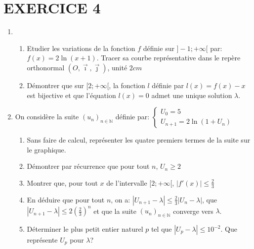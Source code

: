 \documentclass[13pts]{report}
\begin{document}
\section*{EXERCICE 4}
\begin{enumerate}
	\item \begin{enumerate}
				\item Etudier les variations de la fonction $f$ définie sur $]-1; +\infty[$ par: $f(x)=2\ln(x+1)$. Tracer sa courbe représentative dans le repère orthonormal $(O,\overrightarrow{\imath},\overrightarrow{\jmath})$, unité $2 cm$
				\item Démontrer que sur $[2; +\infty[$, la fonction $l$ définie par $l(x)=f(x)-x$ est bijective et que l'équation $l(x)=0$ admet une unique solution $\lambda$.
		  \end{enumerate}
	  \item On considère la suite $(u_n)_{n \in \mathbb{N}}$ définie par: 
	  		$\left\{	\begin{array}{c}
	  					U_0=5 \\
	  					U_{n+1}=2\ln(1+U_n)
	  			\end{array} \right.$
  			\begin{enumerate}
  				\item Sans faire de calcul, représenter les quatre premiers termes de la suite sur le graphique.
  				\item Démontrer par récurrence que pour tout $n$, $U_n\geq 2$
  				\item Montrer que, pour tout $x$ de l'intervalle $[2;+\infty[$, $|f'(x)|\leq \frac{2}{3}$
  				\item En déduire que pour tout $n$, on a: $|U_{n+1}-\lambda|\leq \frac{2}{3}|U_n-\lambda|$, que $|U_{n+1}-\lambda| \leq 2\left(\frac{2}{3} \right)^n$ et que la suite  $(u_n)_{n \in \mathbb{N}}$ converge vers $\lambda$.
  				\item Déterminer le plus petit entier naturel $p$ tel que $|U_p-\lambda| \leq 10^{-2}$. Que représente $U_p$ pour $\lambda$?
  			\end{enumerate}
\end{enumerate}

\end{document}
